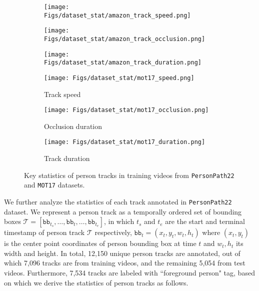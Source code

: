 \documentclass[runningheads]{llncs}
\begin{document}
\begin{figure}[t]
\centering

    \begin{subfigure}{0.26\textwidth}
        \centering
        \texttt{[image: Figs/dataset\_stat/amazon\_track\_speed.png]}
    \end{subfigure}\begin{subfigure}{0.26\textwidth}
        \centering
        \texttt{[image: Figs/dataset\_stat/amazon\_track\_occlusion.png]}
    \end{subfigure}\begin{subfigure}{0.26\textwidth}
        \centering
        \texttt{[image: Figs/dataset\_stat/amazon\_track\_duration.png]}
    \end{subfigure}

    \begin{subfigure}{0.26\textwidth}
        \centering
        \texttt{[image: Figs/dataset\_stat/mot17\_speed.png]}
        \caption{ \small Track speed}
        \label{fig:dataset_stat_speed}
    \end{subfigure}\begin{subfigure}{0.26\textwidth}
        \centering
        \texttt{[image: Figs/dataset\_stat/mot17\_occlusion.png]}
        \caption{ \small Occlusion duration}
        \label{fig:dataset_stat_occlusion}
    \end{subfigure}\begin{subfigure}{0.26\textwidth}
         \centering
         \texttt{[image: Figs/dataset\_stat/mot17\_duration.png]}
        \caption{ \small Track duration}
        \label{fig:dataset_stat_length}
    \end{subfigure}
    \caption{ \small Key statistics of person tracks in training videos from \texttt{PersonPath22}  and \texttt{MOT17} datasets.
}
\end{figure}










We further analyze the statistics of each track annotated in \texttt{PersonPath22} dataset.
We represent a person track as a temporally ordered set of bounding boxes $\mathcal{T} = [\mathtt{bb}_{t_s}, \ldots, \mathtt{bb}_{t}, \ldots, \mathtt{bb}_{t_e}]$, in which $t_s$ and $t_e$ are the start and terminal timestamp of person track $\mathcal{T}$ respectively, $\mathtt{bb}_t = (x_t, y_t, w_t, h_t)$ where $(x_t, y_t)$ is the center point coordinates of person bounding box at time $t$ and $w_t, h_t$ its width and height. 
In total, 12,150 unique person tracks are annotated, out of which 7,096 tracks are from training videos, and the remaining 5,054 from test videos. Furthermore, 7,534 tracks are labeled with ``foreground person" tag, based on which we derive the statistics of person tracks as follows.
\end{document}
